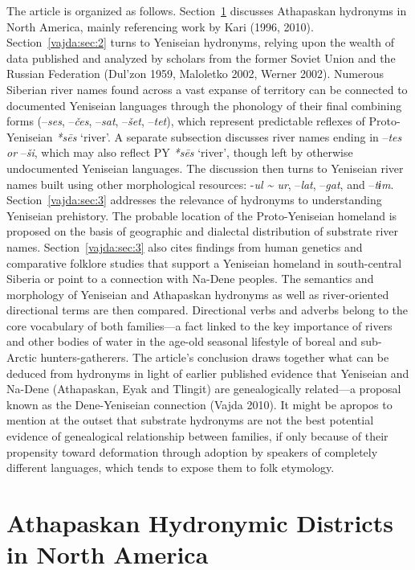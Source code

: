 The article is organized as follows. Section~\ref{vajda:sec:1} discusses Athapaskan hydronyms in North America, mainly referencing work by Kari (1996, 2010). Section~\ref{vajda:sec:2} turns to Yeniseian hydronyms, relying upon the wealth of data published and analyzed by scholars from the former Soviet Union and the Russian Federation (Dul’zon 1959, Maloletko 2002, Werner 2002). Numerous Siberian river names found across a vast expanse of territory can be connected to documented Yeniseian languages through the phonology of their final combining forms (–\textit{ses},\textit{ }–\textit{čes},\textit{ }–\textit{sat},\textit{ }–\textit{šet},\textit{ }–\textit{tet}), which represent predictable reflexes of Proto-Yeniseian \textit{*s\=es} ‘river’. A separate subsection discusses river names ending in –\textit{tes or }–\textit{ši}, which may also reflect PY \textit{*s\=es} ‘river’, though left by otherwise undocumented Yeniseian languages. The discussion then turns to Yeniseian river names built using other morphological resources: -\textit{ul \~{} ur}, –\textit{lat}, –\textit{gat}, and –\textit{tɨm}. Section~\ref{vajda:sec:3} addresses the relevance of hydronyms to understanding Yeniseian prehistory. The probable location of the Proto-Yeniseian homeland is proposed on the basis of geographic and dialectal distribution of substrate river names. Section~\ref{vajda:sec:3} also cites findings from human genetics and comparative folklore studies that support a Yeniseian homeland in south-central Siberia or point to a connection with Na-Dene peoples. The semantics and morphology of Yeniseian and Athapaskan hydronyms as well as river-oriented directional terms are then compared. Directional verbs and adverbs belong to the core vocabulary of both families---a fact linked to the key importance of rivers and other bodies of water in the age-old seasonal lifestyle of boreal and sub-Arctic hunters-gatherers. The article’s conclusion draws together what can be deduced from hydronyms in light of earlier published evidence that Yeniseian and Na-Dene (Athapaskan, Eyak and Tlingit) are genealogically related---a proposal known as the Dene-Yeniseian connection (Vajda 2010). It might be apropos to mention at the outset that substrate hydronyms are not the best potential evidence of genealogical relationship between families, if only because of their propensity toward deformation through adoption by speakers of completely different languages, which tends to expose them to folk etymology.

\section{Athapaskan Hydronymic Districts in North America}\label{vajda:sec:1}

